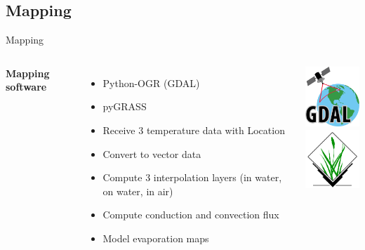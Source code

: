 \documentclass[aspectratio=169,unknownkeysallowed,xcolor=dvipsnames,beamer]{beamer} %
\begin{document}
\subsection{Mapping}
\begin{frame}[fragile]{Mapping}
\begin{columns}
\textbf{Mapping software}
\vspace{5mm}
\begin{itemize}
 \item Python-OGR (GDAL)
 \item pyGRASS
 \item Receive 3 temperature data with Location
 \item Convert to vector data
 \item Compute 3 interpolation layers (in water, on water, in air)
 \item Compute conduction and convection flux
 \item Model evaporation maps
 \end{itemize}
\begin{center}
 \includegraphics[width=2.75cm]{GDALLogoColor}\\
 \includegraphics[width=2.75cm]{Grass_GIS}
\end{center}
\end{columns}
\end{frame}
\end{document}
